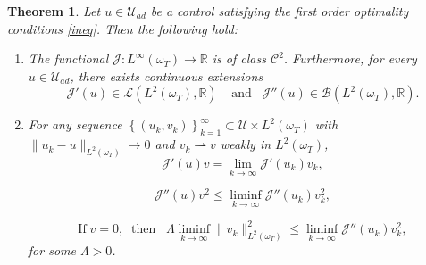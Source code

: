 \documentclass[reqno,twoside]{amsart}
\numberwithin{equation}{section}
\newtheorem{theorem}{Theorem}[section]
\theoremstyle{definition}
\numberwithin{equation}{section}
\def \dis {\displaystyle}
\def \R {\mathbb{R}}
\def \R {\mathbb{R}}
\begin{document}
\begin{theorem}\label{hypothesis}
Let $u\in \mathcal{U}_{ad}$ be a control satisfying the first order optimality conditions \eqref{ineq}. Then the following hold:
\begin{enumerate}[(1)]
	\item The functional $\mathcal{J}:L^\infty(\omega_T)\to \R$ is of class $\mathcal{C}^2$. Furthermore, for every $u\in \mathcal{U}_{ad}$, there exists continuous extensions
	\begin{equation}\label{h1}
		\mathcal{J}'(u)\in \mathcal{L}(L^2(\omega_T),\R)\;\;\;\;\text{and}\;\;\; \mathcal{J}''(u)\in \mathcal{B}(L^2(\omega_T),\R).
	\end{equation}
	\item For any sequence $\left\{(u_k,v_k)\right\}_{k=1}^{\infty}\subset \mathcal{U}\times L^2(\omega_T)$ with $\|u_k-u\|_{L^2(\omega_T)}\to 0$ and $v_k \rightharpoonup v$ weakly in $L^2(\omega_T)$,
	\begin{equation}\label{h2}
		\dis	\mathcal{J}'(u)v=\lim_{k\to \infty} \mathcal{J}'(u_k)v_k,
	\end{equation}
	
	\begin{equation}\label{h3}
		\dis	\mathcal{J}''(u)v^2\leq \liminf_{k\to \infty} \mathcal{J}''(u_k)v_k^2,
	\end{equation}
	
	\begin{equation}\label{h4}
		\dis	\text{If}\; v=0, \;\; \text{then} \;\;\;\Lambda \liminf_{k\to \infty}\|v_k\|^2_{L^2(\omega_T)}\leq\liminf_{k\to \infty} \mathcal{J}''(u_k)v_k^2,
	\end{equation}
	for some $\Lambda>0$.
\end{enumerate}
\end{theorem}
\end{document}
